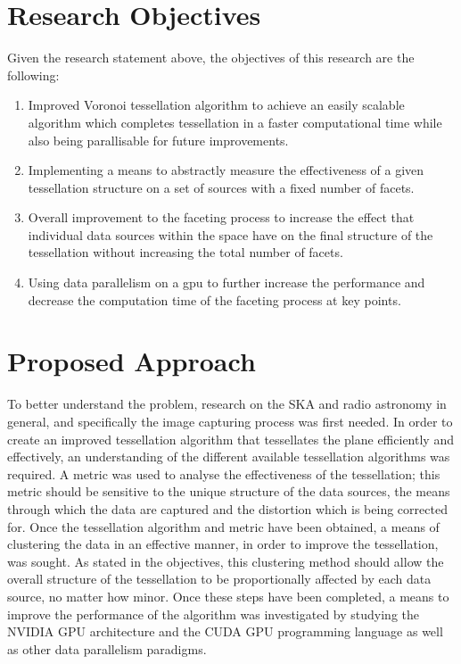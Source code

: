 \section{Research Objectives}
Given the research statement above, the objectives of this research are the following:
\begin{enumerate}
\item Improved Voronoi tessellation algorithm to achieve an easily scalable algorithm which completes tessellation in a faster computational time while also being parallisable for future improvements.
\item Implementing a means to abstractly measure the effectiveness of a given tessellation structure on a set of sources with a fixed number of facets.
\item Overall improvement to the faceting process to increase the effect that individual data sources within the space have on the final structure of the tessellation without increasing the total number of facets.
\item Using data parallelism on a \gls{gpu} to further increase the performance and decrease the computation time of the faceting process at key points.
\end{enumerate}
\section{Proposed Approach}
To better understand the problem, research on the SKA and radio astronomy in general, and specifically the image capturing process was first needed. In order to create an improved tessellation algorithm that tessellates the plane efficiently and effectively, an understanding of the different available tessellation algorithms was required. A metric was used to analyse the effectiveness of the tessellation; this metric should be sensitive to the unique structure of the data sources, the means through which the data are captured and the distortion which is being corrected for. Once the tessellation algorithm and metric have been obtained, a means of clustering the data in an effective manner, in order to improve the tessellation, was sought. As stated in the objectives, this clustering method should allow the overall structure of the tessellation to be proportionally affected by each data source, no matter how minor. Once these steps have been completed, a means to improve the performance of the algorithm was investigated by studying the NVIDIA GPU architecture and the CUDA GPU programming language as well as other data parallelism paradigms.
